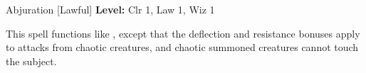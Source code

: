 {Abjuration [Lawful]}
{
	\textbf{Level:}
	Clr 1, Law 1, Wiz 1\\
}
{
	This spell functions like , except that the deflection and resistance bonuses apply to attacks from chaotic creatures, and chaotic summoned creatures cannot touch the subject.

}
